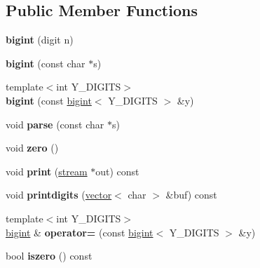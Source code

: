 \subsection*{Public Member Functions}
\begin{DoxyCompactItemize}
\item 
\mbox{\label{structbigint_a8e74f28ee62ce0851f3b6d947463344f}} 
{\bfseries bigint} (digit n)
\item 
\mbox{\label{structbigint_a75949f03e408b5d1871a6a7122474442}} 
{\bfseries bigint} (const char $\ast$s)
\item 
\mbox{\label{structbigint_a623f3e31d947e7bbf8dfe9984d0dc953}} 
{\footnotesize template$<$int Y\+\_\+\+D\+I\+G\+I\+TS$>$ }\\{\bfseries bigint} (const \hyperlink{structbigint}{bigint}$<$ Y\+\_\+\+D\+I\+G\+I\+TS $>$ \&y)
\item 
\mbox{\label{structbigint_a0634f5c2abbcaf7fab7fa4f7eb61f357}} 
void {\bfseries parse} (const char $\ast$s)
\item 
\mbox{\label{structbigint_af3f89b92f9f022f57deb3ec15908cc88}} 
void {\bfseries zero} ()
\item 
\mbox{\label{structbigint_ad32bde5f57a87ed21fc114d951d302f0}} 
void {\bfseries print} (\hyperlink{structstream}{stream} $\ast$out) const
\item 
\mbox{\label{structbigint_afe7caa5c899dfecf66337e338b109a8b}} 
void {\bfseries printdigits} (\hyperlink{structvector}{vector}$<$ char $>$ \&buf) const
\item 
\mbox{\label{structbigint_a0e57759a6513e0b417eba2d14ce6498b}} 
{\footnotesize template$<$int Y\+\_\+\+D\+I\+G\+I\+TS$>$ }\\\hyperlink{structbigint}{bigint} \& {\bfseries operator=} (const \hyperlink{structbigint}{bigint}$<$ Y\+\_\+\+D\+I\+G\+I\+TS $>$ \&y)
\item 
\mbox{\label{structbigint_a69dabbaae951785466a48875e08be9af}} 
bool {\bfseries iszero} () const
\item 

\end{DoxyCompactItemize}
